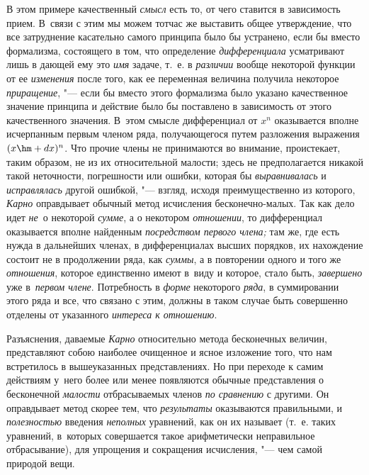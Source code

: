 В этом примере качественный {\em смысл} есть то, от чего ставится в зависимость
прием. В~связи с этим мы можем тотчас же выставить общее утверждение, что все
затруднение касательно самого принципа было бы устранено, если бы вместо
формализма, состоящего в том, что определение {\em дифференциала} усматривают
лишь в дающей ему это {\em имя} задаче, т.~е. в {\em различии} вообще некоторой
функции от ее {\em изменения} после того, как ее переменная величина получила
некоторое {\em приращение}, "--- если бы вместо этого формализма было указано
качественное значение принципа и действие было бы поставлено в зависимость от
этого качественного значения. В~этом смысле дифференциал от $x^n$ оказывается
вполне исчерпанным первым членом ряда, получающегося путем разложения выражения
$(x\hm+dx)^n$. Что прочие члены не принимаются во внимание, проистекает, таким
образом, не из их относительной малости; здесь не предполагается никакой такой
неточности, погрешности или ошибки, которая бы {\em выравнивалась} и
{\em исправлялась} другой ошибкой, "--- взгляд, исходя преимущественно из
которого, {\em Карно} оправдывает обычный метод исчисления бесконечно-малых.
Так как дело идет {\em не}~о некоторой {\em сумме}, а о некотором
{\em отношении}, то дифференциал оказывается вполне найденным {\em посредством
первого члена;} там же, где есть нужда в дальнейших членах, в дифференциалах
высших порядков, их нахождение состоит не в продолжении ряда, как {\em суммы},
а в повторении одного и того же {\em отношения}, которое единственно имеют
в~виду и которое, стало быть, {\em завершено} уже в~{\em первом члене}.
Потребность в {\em форме} некоторого {\em ряда}, в суммировании этого ряда и
все, что связано с этим, должны в таком случае быть совершенно отделены от
указанного {\em интереса к отношению}.

Разъяснения, даваемые {\em Карно} относительно метода бесконечных величин,
представляют собою наиболее очищенное и ясное изложение того, что нам
встретилось в вышеуказанных представлениях. Но при переходе к самим действиям
у~него более или менее появляются обычные представления о бесконечной
{\em малости} отбрасываемых членов {\em по сравнению} с другими. Он
оправдывает метод скорее тем, что {\em результаты} оказываются правильными,
и {\em полезностью} введения {\em неполных} уравнений, как он их называет
(т.~е. таких уравнений, в~которых совершается такое арифметически неправильное
отбрасывание), для упрощения и сокращения исчисления, "--- чем самой
природой вещи.

